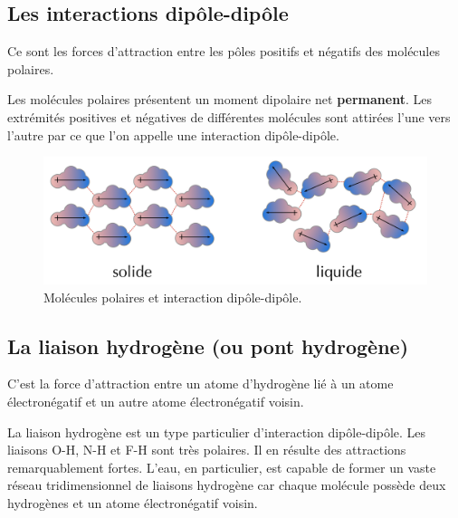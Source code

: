 \documentclass[
  11pt,
  a4paper,
  openany]{book}
\begin{document}
\hypertarget{les-interactions-dipuxf4le-dipuxf4le}{%
\subsection{Les interactions dipôle-dipôle}\label{les-interactions-dipuxf4le-dipuxf4le}}

Ce sont les forces d'attraction entre les pôles positifs et négatifs des molécules polaires.

Les molécules polaires présentent un moment dipolaire net \textbf{permanent}. Les extrémités positives et négatives de différentes molécules sont attirées l'une vers l'autre par ce que l'on appelle une interaction dipôle-dipôle.

\begin{figure}

{\centering \includegraphics[width=0.67\linewidth]{images/dipole-dipole} 

}

\caption{Molécules polaires et interaction dipôle-dipôle.}\label{fig:dipole-dipole}
\end{figure}

\hypertarget{la-liaison-hydroguxe8ne-ou-pont-hydroguxe8ne}{%
\subsection{La liaison hydrogène (ou pont hydrogène)}\label{la-liaison-hydroguxe8ne-ou-pont-hydroguxe8ne}}

C'est la force d'attraction entre un atome d'hydrogène lié à un atome électronégatif et un autre atome électronégatif voisin.

La liaison hydrogène est un type particulier d'interaction dipôle-dipôle. Les liaisons O-H, N-H et F-H sont très polaires. Il en résulte des attractions remarquablement fortes. L'eau, en particulier, est capable de former un vaste réseau tridimensionnel de liaisons hydrogène car chaque molécule possède deux hydrogènes et un atome électronégatif voisin.

\newpage
\end{document}
